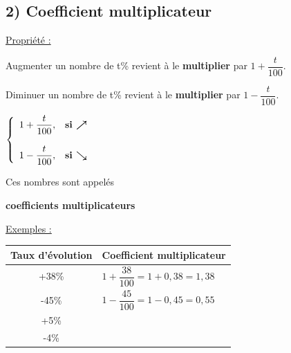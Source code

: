 \documentclass[12pt]{article}
\begin{document}
\vspace{20pt}


\subsection*{\hspace{1cm} 2) Coefficient multiplicateur}

\vspace{5pt}
\begin{mdframed}[
    linewidth=1pt,
    roundcorner=5pt,
    linecolor=Red,
    innertopmargin=10pt,
    innerbottommargin=10pt
]
{\color{red}
\underline{Propriété :}

\vspace{5pt}
Augmenter un nombre de t\% revient à le \textbf{multiplier} par $1 + \dfrac{t}{100}$.

\vspace{5pt}
Diminuer un nombre de t\% revient à le \textbf{multiplier} par $1 - \dfrac{t}{100}$.

\vspace{5pt}
\begin{minipage}[t]{.45\textwidth}%
    \vspace{0pt}
    \hspace{3cm}
    $
    \left\{
        \begin{array}{ll}
            1 + \dfrac{t}{100}, & \mbox{\bf{si $\bm{\nearrow}$}} \\
            \ \\
            1 - \dfrac{t}{100}, & \mbox{\bf{si $\bm{\searrow}$}}
        \end{array}
    \right.
    $
\end{minipage}%
\hfill
\begin{minipage}[t]{.55\textwidth}%
    \vspace{15pt}
    Ces nombres sont appelés 
    
    \textbf{coefficients multiplicateurs}
\end{minipage}%
}
\end{mdframed}

\vspace{5pt}
\underline{Exemples :}

\begin{center}
    \def\arraystretch{3}
    \begin{tabular}{|c|p{8cm}|}
        \hline
        Taux d'évolution & Coefficient multiplicateur \\
        \hline
        +38\% & $1+\dfrac{38}{100} = 1 + 0,38 = 1,38$ \\[8pt]
        \hline
        -45\% & $1-\dfrac{45}{100} = 1 - 0,45 = 0,55$ \\[8pt]
        \hline
        +5\% & \ \ \ \ \ \ \ \ \ \ \ \  \\[40pt]
        \hline
        -4\% & \ \ \ \ \ \ \ \ \ \ \ \  \\[40pt]
        \hline
    \end{tabular}
\end{center}
\end{document}
